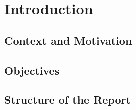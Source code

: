 %
%
\chapter{Introduction} \label{ch:introduction}


\section{Context and Motivation}\label{sec:context-and-motivation}
\lipsum[1]


\section{Objectives}\label{sec:objectives}
\lipsum[1]


\section{Structure of the Report}\label{sec:structure-of-the-report}
\lipsum[1]